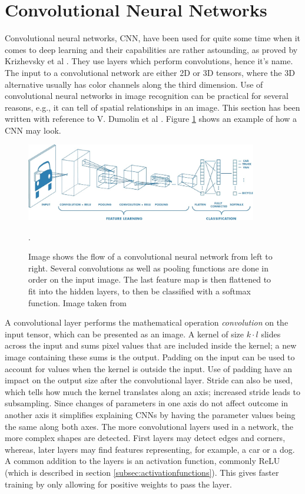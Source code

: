  \section{Convolutional Neural Networks}
 \label{sec:CNN}
Convolutional neural networks, CNN, have been used for quite some time when it comes to deep learning and their capabilities are rather astounding, as proved by Krizhevsky et al \cite{NIPS2012_4824}.  They use layers which perform convolutions, hence it's name.  The input to a convolutional network are either 2D or 3D tensors, where the 3D alternative usually has color channels along the third dimension. Use of convolutional neural networks in image recognition  can be practical for several reasons, e.g., it can tell of spatial relationships in an image. This section has been written with reference to V. Dumolin et al \cite{convArit}. Figure \ref{fig:cnn} shows an example of how a CNN may look.
 
 \begin{figure}[hbtp]
\begin{center}
\includegraphics[width = 0.9\textwidth]{./Images/convNetwork.jpg}
\caption{Image shows the flow of a convolutional neural network from left to right. Several convolutions as well as pooling functions are done in order on the input image. The last feature map is then flattened to fit into the hidden layers, to then be classified with a softmax function. Image taken from \cite{cnnImage}}.
\label{fig:cnn}
\end{center}
\end{figure}
 
A convolutional layer performs the mathematical operation \textit{convolution} on the input tensor, which can be presented as an image. A kernel of size $k \cdot l$ slides across the input and sums pixel values that are included inside the kernel; a new image containing these sums is the output. Padding on the input can be used to account for values when the kernel is outside the input. Use of padding have an impact on the output size after the convolutional layer. Stride can also be used, which tells how much the kernel translates along an axis;  increased stride leads to subsampling. Since changes of parameters in one axis do not affect outcome in another axis it simplifies explaining CNNs by having the parameter values being the same along both axes. The more convolutional layers used in a network, the more complex shapes are detected. First layers may detect edges and corners, whereas, later layers may find features representing, for example, a car or a dog. A common addition to the layers is an activation function, commonly ReLU (which is described in section \ref{subsec:activationfunctions}). This gives faster training by only allowing for positive weights to pass the layer.

